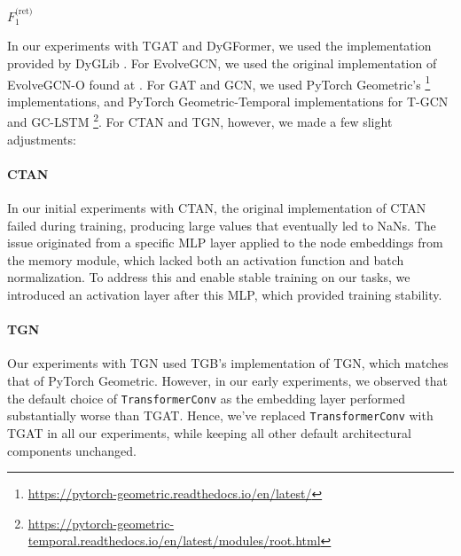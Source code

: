 {
\SetAlgoNoEnd
\makeatletter
\renewcommand{\@algocf@pre@ruled}{}
\renewcommand{\algocf@caption@ruled}{%
  \box\algocf@capbox\par\kern\interspacetitleruled
}
\makeatother
\begin{algorithm}
    \setcounter{AlgoLine}{32}
    \Return $F^{\text{(ret)}}_1$\;
\end{algorithm}
}

In our experiments with TGAT and DyGFormer, we used the implementation provided by DyGLib \cite{dygformer}. For EvolveGCN, we used the original implementation of EvolveGCN-O found at \cite{evolvegcn}. For GAT and GCN, we used PyTorch Geometric's \footnote[2]{\url{https://pytorch-geometric.readthedocs.io/en/latest/}} implementations, and PyTorch Geometric-Temporal implementations for T-GCN and GC-LSTM \footnote[3]{\url{https://pytorch-geometric-temporal.readthedocs.io/en/latest/modules/root.html}}. For CTAN and TGN, however, we made a few slight adjustments:

\paragraph{CTAN} In our initial experiments with CTAN, the original implementation of CTAN \cite{ctan} failed during training, producing large values that eventually led to NaNs. The issue originated from a specific MLP layer applied to the node embeddings from the memory module, which lacked both an activation function and batch normalization. To address this and enable stable training on our tasks, we introduced an activation layer after this MLP, which provided training stability.
\paragraph{TGN}
Our experiments with TGN used TGB's \cite{tgb} implementation of TGN, which matches that of PyTorch Geometric. However, in our early experiments, we observed that the default choice of \texttt{TransformerConv} as the embedding layer performed substantially worse than TGAT. Hence, we've replaced \texttt{TransformerConv} with TGAT in all our experiments, while keeping all other default architectural components unchanged.

